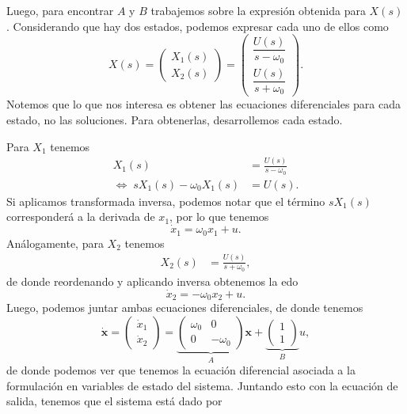\documentclass[
  11pt,
  letterpaper,
   addpoints,
  answers
  ]{exam}
\begin{document}
\begin{questions}
\begin{solution}
Luego, para encontrar $A$ y $B$ trabajemos sobre la expresión obtenida para $X(s)$. Considerando que hay dos estados, podemos expresar cada uno de ellos como
\begin{equation}
X(s)=
\begin{pmatrix}
X_1(s)\\[2pt]
X_2(s)
\end{pmatrix}
=
\begin{pmatrix}
\dfrac{U(s)}{s-\omega_0}\\[6pt]
\dfrac{U(s)}{s+\omega_0}
\end{pmatrix}.
\end{equation}
Notemos que lo que nos interesa es obtener las ecuaciones diferenciales para cada estado, no las soluciones. Para obtenerlas, desarrollemos cada estado.

Para $X_1$ tenemos
\begin{align}
X_1(s)&=\frac{U(s)}{s-\omega_0}\\
\Leftrightarrow\; sX_1(s)-\omega_0 X_1(s)&=U(s).
\end{align}
Si aplicamos transformada inversa, podemos notar que el término $sX_1(s)$ corresponderá a la derivada de $x_1$, por lo que tenemos
\begin{equation}
\dot{x}_1=\omega_0 x_1+u.
\end{equation}
Análogamente, para $X_2$ tenemos
\begin{align}
X_2(s)&=\frac{U(s)}{s+\omega_0},
\end{align}
de donde reordenando y aplicando inversa obtenemos la edo
\begin{equation}
\dot{x}_2=-\omega_0 x_2+u.
\end{equation}
Luego, podemos juntar ambas ecuaciones diferenciales, de donde tenemos
\begin{equation}
\dot{\mathbf{x}}=
\begin{pmatrix}
\dot{x}_1\\[2pt]
\dot{x}_2
\end{pmatrix}
=
\underbrace{\begin{pmatrix}\omega_0 & 0\\[2pt] 0 & -\omega_0\end{pmatrix}}_{A}\mathbf{x}
+\underbrace{\begin{pmatrix}1\\[2pt]1\end{pmatrix}}_{B}u,
\end{equation}
de donde podemos ver que tenemos la ecuación diferencial asociada a la formulación en variables de estado del sistema. Juntando esto con la ecuación de salida, tenemos que el sistema está dado por

\end{solution}
\end{questions}
\end{document}
